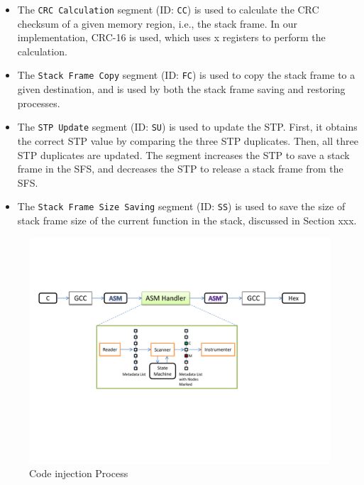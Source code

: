 \begin{itemize}

\item The \texttt{CRC Calculation} segment (ID: \texttt{CC}) is used to calculate the CRC checksum of a given memory region, i.e., the stack frame. In our implementation, CRC-16 is used, which uses x registers to perform the calculation.

\item The \texttt{Stack Frame Copy} segment (ID: \texttt{FC}) is used to copy the stack frame to a given destination, and is used by both the stack frame saving and restoring processes.

\item The \texttt{STP Update} segment (ID: \texttt{SU}) is used to update the STP. First, it obtains the correct STP value by comparing the three STP duplicates. Then, all three STP duplicates are updated. The segment increases the STP to save a stack frame in the SFS, and decreases the STP to release a stack frame from the SFS.

\item The \texttt{Stack Frame Size Saving} segment (ID: \texttt{SS}) is used to save the size of stack frame size of the current function in the stack, discussed in Section xxx.

\end{itemize}

\begin{figure}[t]
\centering
\includegraphics[width=1\textwidth]{figures/code_inject_process_v3}
\caption{Code injection Process}
\label{fig:code_injection_process}
\end{figure}

